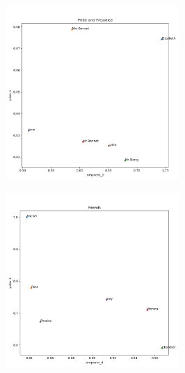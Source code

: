 \documentclass{article}
\newcommand{\mediumimagewidth}{250}
\begin{document}
\begin{titlepage}
\begin{figure}[H]
\centering
\includegraphics[width=\mediumimagewidth]{images/Pride and Prejudice_heuristics.png}
\end{figure}

\begin{figure}[H]
\centering
\includegraphics[width=\mediumimagewidth]{images/Friends_heuristics.png}
\end{figure}


\end{titlepage}
\end{document}
